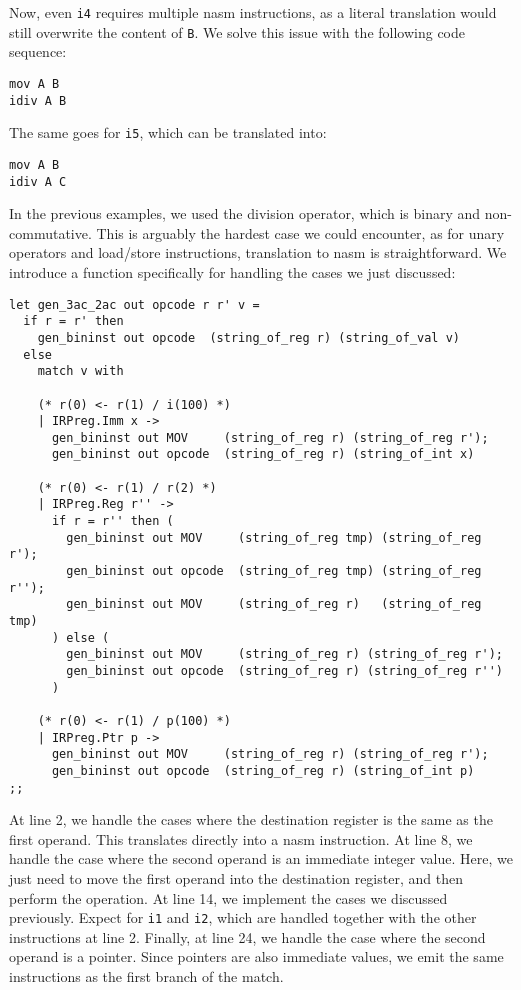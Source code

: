 Now, even \texttt{i4} requires multiple \gls{nasm} instructions, as a literal translation would still overwrite the content of \texttt B. We solve this issue with the following code sequence:

\begin{lstlisting}
mov A B
idiv A B
\end{lstlisting}

The same goes for \texttt{i5}, which can be translated into:

\begin{lstlisting}
mov A B
idiv A C
\end{lstlisting}

In the previous examples, we used the division operator, which is binary and non-commutative. This is arguably the hardest case we could encounter, as for unary operators and load/store instructions, translation to \gls{nasm} is straightforward.
We introduce a function specifically for handling the cases we just discussed:

\begin{lstlisting}[style=OCaml]
let gen_3ac_2ac out opcode r r' v =
  if r = r' then
    gen_bininst out opcode  (string_of_reg r) (string_of_val v)
  else
    match v with

    (* r(0) <- r(1) / i(100) *)
    | IRPreg.Imm x ->
      gen_bininst out MOV     (string_of_reg r) (string_of_reg r');
      gen_bininst out opcode  (string_of_reg r) (string_of_int x)

    (* r(0) <- r(1) / r(2) *)
    | IRPreg.Reg r'' ->
      if r = r'' then (
        gen_bininst out MOV     (string_of_reg tmp) (string_of_reg r');
        gen_bininst out opcode  (string_of_reg tmp) (string_of_reg r'');
        gen_bininst out MOV     (string_of_reg r)   (string_of_reg tmp)
      ) else (
        gen_bininst out MOV     (string_of_reg r) (string_of_reg r');
        gen_bininst out opcode  (string_of_reg r) (string_of_reg r'')
      )

    (* r(0) <- r(1) / p(100) *)
    | IRPreg.Ptr p ->
      gen_bininst out MOV     (string_of_reg r) (string_of_reg r');
      gen_bininst out opcode  (string_of_reg r) (string_of_int p)
;;
\end{lstlisting}

At line 2, we handle the cases where the destination register is the same as the first operand. This translates directly into a \gls{nasm} instruction. At line 8, we handle the case where the second operand is an immediate integer value. Here, we just need to move the first operand into the destination register, and then perform the operation. At line 14, we implement the cases we discussed previously. Expect for \texttt{i1} and \texttt{i2}, which are handled together with the other instructions at line 2. Finally, at line 24, we handle the case where the second operand is a pointer. Since pointers are also immediate values, we emit the same instructions as the first branch of the match.

